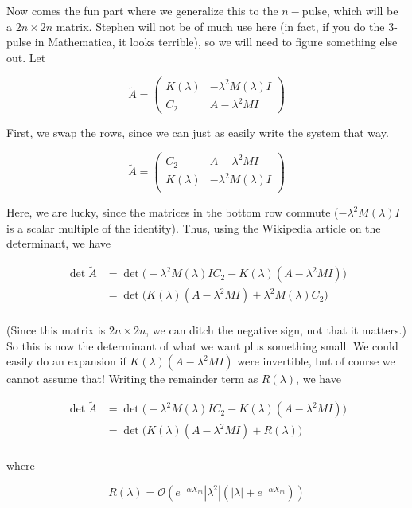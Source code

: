 \documentclass[12pt]{article}
\begin{document}
Now comes the fun part where we generalize this to the $n-$pulse, which will be a $2n \times 2n$ matrix. Stephen will not be of much use here (in fact, if you do the 3-pulse in Mathematica, it looks terrible), so we will need to figure something else out. Let

\[
\tilde{A} = 
\begin{pmatrix}
K(\lambda) & -\lambda^2 M(\lambda) I  \\
C_2 & A - \lambda^2 MI
\end{pmatrix}
\]

First, we swap the rows, since we can just as easily write the system that way.

\[
\tilde{A} = 
\begin{pmatrix}
C_2 & A - \lambda^2 MI \\
K(\lambda) & -\lambda^2  M(\lambda) I  \\
\end{pmatrix}
\]

Here, we are lucky, since the matrices in the bottom row commute ($-\lambda^2  M(\lambda) I$ is a scalar multiple of the identity). Thus, using the Wikipedia article on the determinant, we have


\begin{align*}
\det \tilde{A} &= \det \Big( 
-\lambda^2  M(\lambda) I C_2 - 
K(\lambda)(A -\lambda^2  MI) \Big) \\
&= \det \Big( K(\lambda)(A -\lambda^2  MI) + 
\lambda^2 M(\lambda) C_2 
 \Big) \\
\end{align*}

(Since this matrix is $2n \times 2n$, we can ditch the negative sign, not that it matters.) So this is now the determinant of what we want plus something small. We could easily do an expansion if $K(\lambda)(A -\lambda^2  MI)$ were invertible, but of course we cannot assume that! Writing the remainder term as $R(\lambda)$, we have

\begin{align}\label{tildeAn}
\det \tilde{A} &= \det \Big( 
-\lambda^2  M(\lambda) I C_2 - 
K(\lambda)(A -\lambda^2  MI) \Big) \\
&= \det \Big( K(\lambda)(A -\lambda^2  MI) + 
R(\lambda)
 \Big) \\
\end{align}

where

\[
R(\lambda) = \mathcal{O}(e^{-\alpha X_m}|\lambda^2|(|\lambda| + e^{-\alpha X_m}) )
\]
\end{document}
